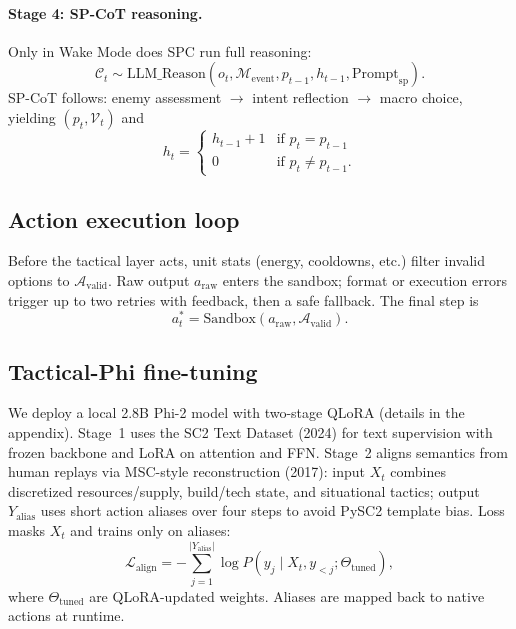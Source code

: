 \documentclass[11pt,a4paper]{article}
\begin{document}
\paragraph{Stage 4: SP-CoT reasoning.}
Only in Wake Mode does SPC run full reasoning:
\begin{equation}
\mathcal{C}_t \sim \text{LLM\_Reason}(o_t, \mathcal{M}_{\text{event}}, p_{t-1}, h_{t-1}, \text{Prompt}_{\text{sp}}).
\end{equation}
SP-CoT follows: enemy assessment $\rightarrow$ intent reflection $\rightarrow$ macro choice, yielding $(p_t, \mathcal{V}_t)$ and
\begin{equation}
h_t = \begin{cases}
h_{t-1} + 1 & \text{if } p_t = p_{t-1} \\
0 & \text{if } p_t \neq p_{t-1}.
\end{cases}
\end{equation}

\subsection{Action execution loop}
\label{sec:sandbox}

Before the tactical layer acts, unit stats (energy, cooldowns, etc.) filter invalid options to $\mathcal{A}_{\text{valid}}$. Raw output $a_{\text{raw}}$ enters the sandbox; format or execution errors trigger up to two retries with feedback, then a safe fallback. The final step is
\begin{equation}
a_t^* = \text{Sandbox}(a_{\text{raw}}, \mathcal{A}_{\text{valid}}).
\end{equation}

\subsection{Tactical-Phi fine-tuning}
\label{sec:phi}

We deploy a local 2.8B Phi-2 model with two-stage QLoRA (details in the appendix). Stage~1 uses the SC2 Text Dataset (2024) for text supervision with frozen backbone and LoRA on attention and FFN. Stage~2 aligns semantics from human replays via MSC-style reconstruction (2017): input $X_t$ combines discretized resources/supply, build/tech state, and situational tactics; output $Y_{\text{alias}}$ uses short action aliases over four steps to avoid PySC2 template bias. Loss masks $X_t$ and trains only on aliases:
\begin{equation}
\mathcal{L}_{\text{align}} = - \sum_{j=1}^{|Y_{\text{alias}}|} \log P(y_j \mid X_t, y_{<j}; \Theta_{\text{tuned}}),
\end{equation}
where $\Theta_{\text{tuned}}$ are QLoRA-updated weights. Aliases are mapped back to native actions at runtime.
\end{document}
